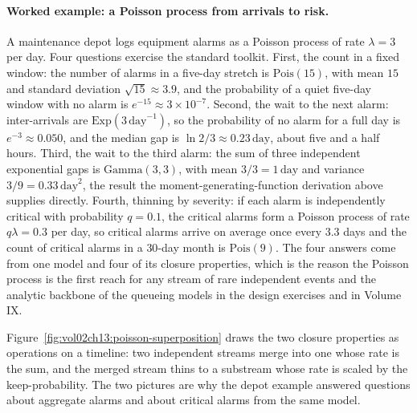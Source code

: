 \paragraph{Worked example: a Poisson process from arrivals to risk.}
A maintenance depot logs equipment alarms as a Poisson process of
rate $\lambda = 3$ per day. Four questions exercise the standard
toolkit. First, the count in a fixed window: the number of alarms in
a five-day stretch is $\mathrm{Pois}(15)$, with mean $15$ and standard
deviation $\sqrt{15} \approx 3.9$, and the probability of a quiet
five-day window with no alarm is $e^{-15} \approx 3 \times 10^{-7}$.
Second, the wait to the next alarm: inter-arrivals are
$\mathrm{Exp}(3\,\text{day}^{-1})$, so the probability of no alarm for
a full day is $e^{-3} \approx 0.050$, and the median gap is
$\ln 2 / 3 \approx 0.23\,\text{day}$, about five and a half hours.
Third, the wait to the third alarm: the sum of three independent
exponential gaps is $\mathrm{Gamma}(3, 3)$, with mean $3/3 = 1\,
\text{day}$ and variance $3/9 = 0.33\,\text{day}^{2}$, the result the
moment-generating-function derivation above supplies directly. Fourth,
thinning by severity: if each alarm is independently critical with
probability $q = 0.1$, the critical alarms form a Poisson process of
rate $q\lambda = 0.3$ per day, so critical alarms arrive on average
once every $3.3$ days and the count of critical alarms in a $30$-day
month is $\mathrm{Pois}(9)$. The four answers come from one model and
four of its closure properties, which is the reason the Poisson
process is the first reach for any stream of rare independent events
and the analytic backbone of the queueing models in the design
exercises and in Volume IX.



Figure~\ref{fig:vol02ch13:poisson-superposition} draws the two closure
properties as operations on a timeline: two independent streams merge
into one whose rate is the sum, and the merged stream thins to a
substream whose rate is scaled by the keep-probability. The two pictures
are why the depot example answered questions about aggregate alarms and
about critical alarms from the same model.

